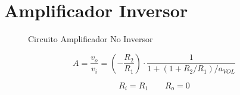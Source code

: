 \chapter{Amplificador Inversor}

\begin{figure}[ht]
	\begin{center}
		
	\caption{Circuito Amplificador No Inversor}
	\label{fig:inv}
	\end{center}
\end{figure}

\begin{equation}
A = \frac{v_o}{v_i} = \left(-\frac{R_2}{R_1}\right) \cdot \frac{1}{1+(1+R_2/R_1)/a_{VOL}}
\end{equation}

\begin{equation}
R_i=R_1 \qquad R_o=0
\end{equation}